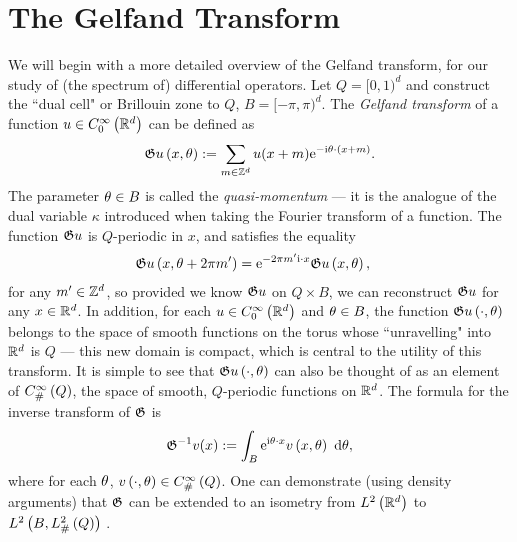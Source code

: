 \section{The Gelfand Transform} \label{sec:TP-GelfandTransform}
We will begin with a more detailed overview of the Gelfand transform, for our study of (the spectrum of) differential operators.
Let $Q=[0,1)^d$  and construct the ``dual cell" or Brillouin zone to $Q$, $B=[-\pi,\pi)^d$.
The \emph{Gelfand transform} of a function $u\in C^{\infty}_{0}\left( \mathbb{R}^d \right)$ can be defined as
\begin{align*}
	\mathfrak{G} u\left( x,\theta \right) := \sum_{m\in\mathbb{Z}^d}u(x+m)\mathrm{e}^{-\mathrm{i}\theta\cdot(x+m)}.
\end{align*}
The parameter $\theta\in B$ is called the \emph{quasi-momentum} --- it is the analogue of the dual variable $\kappa$ introduced when taking the Fourier transform of a function.
The function $\mathfrak{G} u$ is $Q$-periodic in $x$, and satisfies the equality
\begin{align} \label{eq:GelfandTransform}
	\mathfrak{G} u\left( x,\theta+2\pi m' \right) &= \mathrm{e}^{-2\pi m'\mathrm{i}\cdot x}\mathfrak{G} u\left( x,\theta \right),
\end{align}
for any $m'\in\mathbb{Z}^d$, so provided we know $\mathfrak{G} u$ on $Q\times B$, we can reconstruct $\mathfrak{G} u$ for any $x\in\mathbb{R}^d$.
In addition, for each $u\in C^{\infty}_{0}\left( \mathbb{R}^d \right)$ and $\theta\in B$, the function $\mathfrak{G} u\left( \cdot,\theta \right)$ belongs to the space of smooth functions on the torus whose ``unravelling"  into $\mathbb{R}^d$ is $Q$ --- this new domain is compact, which is central to the utility of this transform.
It is simple to see that $\mathfrak{G} u\left( \cdot,\theta \right)$ can also be thought of as an element of $C^{\infty}_{\#}\left( Q \right)$, the space of smooth, $Q$-periodic functions on $\mathbb{R}^d$.
The formula for the inverse transform of $\mathfrak{G}$ is
\begin{align*}
	\mathfrak{G}^{-1}v (x) := \int_{B}\mathrm{e}^{\mathrm{i}\theta\cdot x}v\left( x,\theta \right) \ \mathrm{d}\theta,
\end{align*}
where for each $\theta$, $v\left( \cdot,\theta \right)\in C^{\infty}_{\#}\left( Q \right)$.
One can demonstrate (using density arguments) that $\mathfrak{G}$ can be extended to an isometry from $L^2\left( \mathbb{R}^d \right)$ to $L^2\left( B,L^2_{\#}\left( Q \right) \right)$ .

